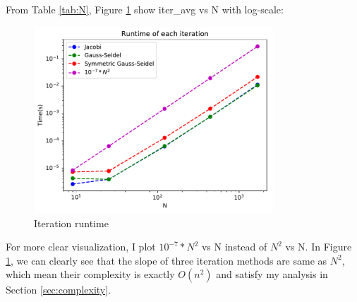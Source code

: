 \documentclass{article}
\begin{document}
From Table \ref{tab:N}, Figure \ref{fig:complexity} show iter\_avg vs N with log-scale:
\begin{figure}[H]
    \centering
    \includegraphics[width=0.8\textwidth]{src/complexity.pdf}
    \caption{Iteration runtime}
    \label{fig:complexity}
\end{figure}
For more clear visualization, I plot $10^{-7} * N^2$ vs N instead of $N^2$ vs N. In Figure \ref{fig:complexity}, we can clearly see
that the slope of three iteration methods are same as $N^2$, which mean their complexity is exactly $O(n^2)$ and satisfy 
my analysis in Section \ref{sec:complexity}.
\end{document}

